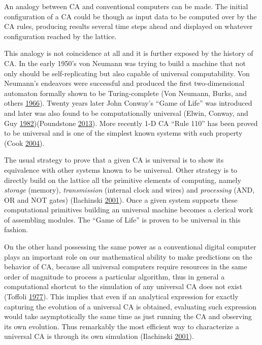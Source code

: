 \documentclass[
]{book}
\begin{document}
An analogy between CA and conventional computers can be made. The initial configuration of a CA could be though as input data to be computed over by the CA rules, producing results several time steps ahead and displayed on whatever configuration reached by the lattice.

This analogy is not coincidence at all and it is further exposed by the history of CA. In the early 1950's von Neumann was trying to build a machine that not only should be self-replicating but also capable of universal computability. Von Neumann's endeavors were successful and produced the first two-dimensional automaton formally shown to be Turing-complete (Von Neumann, Burks, and others \protect\hyperlink{ref-von1966theory}{1966}). Twenty years later John Conway's ``Game of Life'' was introduced and later was also found to be computationally universal (Elwin, Conway, and Guy \protect\hyperlink{ref-elwin1982winning}{1982})(Poundstone \protect\hyperlink{ref-poundstone2013recursive}{2013}). More recently 1-D CA ``Rule 110'' has been proved to be universal and is one of the simplest known systems with such property (Cook \protect\hyperlink{ref-cook2004universality}{2004}).

The usual strategy to prove that a given CA is universal is to show its equivalence with other systems known to be universal. Other strategy is to directly build on the lattice all the primitive elements of computing, namely \emph{storage} (memory), \emph{transmission} (internal clock and wires) and \emph{processing} (AND, OR and NOT gates) (Ilachinski \protect\hyperlink{ref-ilachinski2001cellular}{2001}). Once a given system supports these computational primitives building an universal machine becomes a clerical work of assembling modules. The ``Game of Life'' is proven to be universal in this fashion.

On the other hand possessing the same power as a conventional digital computer plays an important role on our mathematical ability to make predictions on the behavior of CA, because all universal computers require resources in the same order of magnitude to process a particular algorithm, thus in general a computational shortcut to the simulation of any universal CA does not exist (Toffoli \protect\hyperlink{ref-toffoli1977cellular}{1977}). This implies that even if an analytical expression for exactly capturing the evolution of a universal CA is obtained, evaluating such expression would take asymptotically the same time as just running the CA and observing its own evolution. Thus remarkably the most efficient way to characterize a universal CA is through its own simulation (Ilachinski \protect\hyperlink{ref-ilachinski2001cellular}{2001}).
\end{document}
